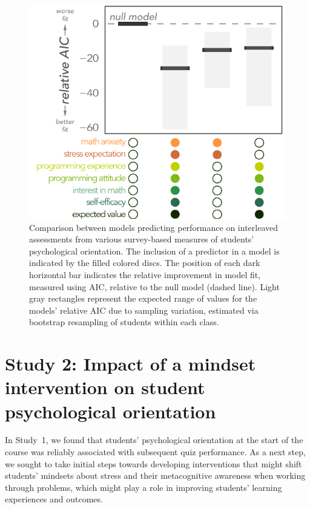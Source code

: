 \documentclass[10pt,letterpaper]{article}
\begin{document}
\begin{figure}[th!]
\begin{center}
\includegraphics[width=0.85\linewidth]{figures_cogsci/2023_student_eoc_construct_aic.pdf}
\end{center}
\caption{Comparison between models predicting performance on interleaved assessments from various survey-based measures of students' psychological orientation. The inclusion of a predictor in a model is indicated by the filled colored discs. The position of each dark horizontal bar indicates the relative improvement in model fit, measured using AIC, relative to the null model (dashed line). Light gray rectangles represent the expected range of values for the models' relative AIC due to sampling variation, estimated via bootstrap resampling of students within each class.} 
\label{fig:coursekata_eoc_survey_aic}
\end{figure}

\section{Study 2: Impact of a mindset intervention on student psychological orientation}

In Study~1, we found that students' psychological orientation at the start of the course was reliably associated with subsequent quiz performance. 
As a next step, we sought to take initial steps towards developing interventions that might shift students' mindsets about stress and their metacognitive awareness when working through problems, which might play a role in improving students' learning experiences and outcomes.
\end{document}
